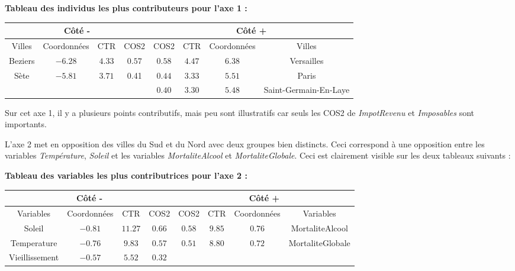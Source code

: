 \documentclass{article}
\begin{document}
\bigskip

\textbf{Tableau des individus les plus contributeurs pour l'axe 1 :}
\begin{center}
\begin{tabular}{|c|c|c|c||c|c|c|c|}
\multicolumn{4}{c}{Côté -} & \multicolumn{4}{c}{Côté +}\\
\hline 
Villes & Coordonnées & CTR & COS2 & COS2 & CTR & Coordonnées & Villes \\ 
\hline 
Beziers & $-6.28$ & $4.33$ & $0.57$ & $0.58$ & $4.47$ & $6.38$ & Versailles \\ 
\hline 
Sète & $-5.81$  & $3.71$ & 0.41 & $0.44$ & $3.33$ & $5.51$ & Paris\\ 
\hline 
 &  &  &  & $0.40$ & $3.30$ & $5.48$ & Saint-Germain-En-Laye \\ 
\hline 
\end{tabular} 
\end{center}

Sur cet axe 1, il y a plusieurs points contributifs, mais peu sont illustratifs car seuls les COS2 de \emph{ImpotRevenu} et \emph{Imposables} sont importants.

\bigskip

L'axe 2 met en opposition des villes du Sud et du Nord avec deux groupes bien distincts. Ceci correspond à une opposition entre les variables \emph{Température}, \emph{Soleil} et les variables \emph{MortaliteAlcool} et \emph{MortaliteGlobale}. Ceci est clairement visible sur les deux tableaux suivants :

\textbf{Tableau des variables les plus contributrices pour l'axe 2 :}
\begin{center}
\begin{tabular}{|c|c|c|c||c|c|c|c|}
\multicolumn{4}{c}{Côté -} & \multicolumn{4}{c}{Côté +}\\
\hline 
Variables & Coordonnées & CTR & COS2 & COS2 & CTR & Coordonnées & Variables \\ 
\hline 
Soleil & $-0.81$ & $11.27$ & $0.66$  & $0.58$  & $9.85$ & $0.76$ & MortaliteAlcool  \\ 
\hline 
 Temperature& $-0.76$ & $9.83$ & $0.57$ & $0.51$ & $8.80$ &  $0.72$ & MortaliteGlobale\\ 
\hline 
Vieillissement & $-0.57$  & $5.52$ & $0.32$ &  &  & &  \\ 
\hline 
\end{tabular} 
\end{center}

\bigskip
\end{document}
